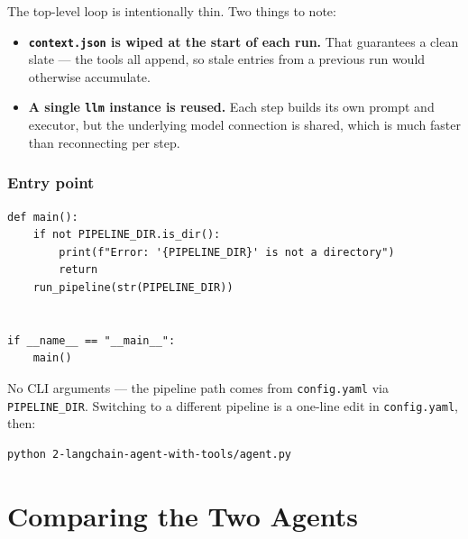 \documentclass[12pt, a4paper]{article}
\begin{document}
The top-level loop is intentionally thin. Two things to note:

\begin{itemize}[leftmargin=1.5em]
  \item \textbf{\texttt{context.json} is wiped at the start of each run.} That guarantees a clean slate — the tools all append, so stale entries from a previous run would otherwise accumulate.
  \item \textbf{A single \texttt{llm} instance is reused.} Each step builds its own prompt and executor, but the underlying model connection is shared, which is much faster than reconnecting per step.
\end{itemize}

\subsubsection{Entry point}

\begin{lstlisting}[style=pythonstyle]
def main():
    if not PIPELINE_DIR.is_dir():
        print(f"Error: '{PIPELINE_DIR}' is not a directory")
        return
    run_pipeline(str(PIPELINE_DIR))


if __name__ == "__main__":
    main()
\end{lstlisting}

No CLI arguments — the pipeline path comes from \texttt{config.yaml} via \texttt{PIPELINE\_DIR}. Switching to a different pipeline is a one-line edit in \texttt{config.yaml}, then:

\begin{lstlisting}[style=shellstyle]
python 2-langchain-agent-with-tools/agent.py
\end{lstlisting}

\section{Comparing the Two Agents}
\end{document}
